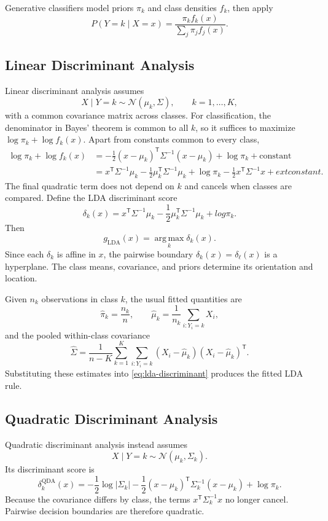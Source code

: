 \documentclass[12pt,oneside]{book}
\numberwithin{equation}{section}
\theoremstyle{definition}
\theoremstyle{plain}
\theoremstyle{remark}
\newcommand{\argmax}{\operatorname*{arg\,max}}
\begin{document}
Generative classifiers model priors $\pi_k$ and class densities $f_k$, then
apply
\[
 P(Y=k\mid X=x)=\frac{\pi_kf_k(x)}{\sum_j\pi_jf_j(x)}.
\]

\subsection{Linear Discriminant Analysis}
Linear discriminant analysis assumes
\[
 X\mid Y=k\sim\mathcal N(\mu_k,\Sigma),
 \qquad k=1,\ldots,K,
\]
with a common covariance matrix across classes. For classification, the
denominator in Bayes' theorem is common to all $k$, so it suffices to maximize
$\log\pi_k+\log f_k(x)$. Apart from constants common to every class,
\begin{align*}
 \log\pi_k+\log f_k(x)
 &=-\frac12(x-\mu_k)^\mathsf T\Sigma^{-1}(x-\mu_k)
   +\log\pi_k+\text{constant}\\
 &=x^\mathsf T\Sigma^{-1}\mu_k
   -\frac12\mu_k^\mathsf T\Sigma^{-1}\mu_k
   +\log\pi_k
   -\frac12x^\mathsf T\Sigma^{-1}x+	ext{constant}.
\end{align*}
The final quadratic term does not depend on $k$ and cancels when classes are
compared. Define the LDA discriminant score
\begin{equation}
 \delta_k(x)=x^\mathsf T\Sigma^{-1}\mu_k
 -\frac12\mu_k^\mathsf T\Sigma^{-1}\mu_k+log\pi_k.
 \label{eq:lda-discriminant}
\end{equation}
Then
\[
 g_{\mathrm{LDA}}(x)=\argmax_k\delta_k(x).
\]
Since each $\delta_k$ is affine in $x$, the pairwise boundary
$\delta_k(x)=\delta_\ell(x)$ is a hyperplane. The class means, covariance,
and priors determine its orientation and location.

Given $n_k$ observations in class $k$, the usual fitted quantities are
\[
 \widehat\pi_k=\frac{n_k}{n},
 \qquad
 \widehat\mu_k=\frac1{n_k}\sum_{i:Y_i=k}X_i,
\]
and the pooled within-class covariance
\[
 \widehat\Sigma
 =\frac1{n-K}\sum_{k=1}^K
   \sum_{i:Y_i=k}(X_i-\widehat\mu_k)(X_i-\widehat\mu_k)^\mathsf T.
\]
Substituting these estimates into \eqref{eq:lda-discriminant} produces the
fitted LDA rule.

\subsection{Quadratic Discriminant Analysis}
Quadratic discriminant analysis instead assumes
\[
 X\mid Y=k\sim\mathcal N(\mu_k,\Sigma_k).
\]
Its discriminant score is
\begin{equation}
 \delta_k^{\mathrm{QDA}}(x)
 =-\frac12\log|\Sigma_k|
  -\frac12(x-\mu_k)^\mathsf T\Sigma_k^{-1}(x-\mu_k)
  +\log\pi_k.
 \label{eq:qda-discriminant}
\end{equation}
Because the covariance differs by class, the terms
$x^\mathsf T\Sigma_k^{-1}x$ no longer cancel. Pairwise decision boundaries
are therefore quadratic.
\end{document}
